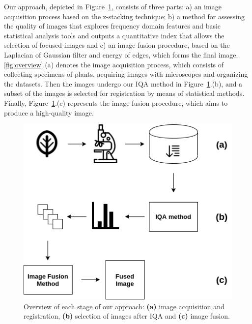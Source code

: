 Our approach, depicted in Figure~\ref{fig:overview}, consists of three parts: a) an image acquisition process based on the z-stacking technique; b) a method for assessing the quality of images that explores frequency domain features and basic statistical analysis tools and outputs a quantitative index that allows the selection of focused images and c) an image fusion procedure, based on the Laplacian of Gaussian filter and energy of edges, which forms the final image. \autoref{fig:overview}.(a) denotes the image acquisition process, which consists of collecting specimens of plants, acquiring images with microscopes and organizing the datasets. Then the images undergo our IQA method in Figure~\ref{fig:overview}.(b), and a subset of the images is selected for registration by means of statistical methods. Finally, Figure~\ref{fig:overview}.(c) represents the image fusion procedure, which aims to produce a high-quality image.

\begin{figure}[ht]
  \centering
  \caption{Overview of each stage of our approach: \textbf{(a)} image acquisition and registration, \textbf{(b)} selection of images after IQA and \textbf{(c)} image fusion.}
  \label{fig:overview}
  \includegraphics[scale=0.8]{images/overview.png}
  \centering
  \fautor
\end{figure}